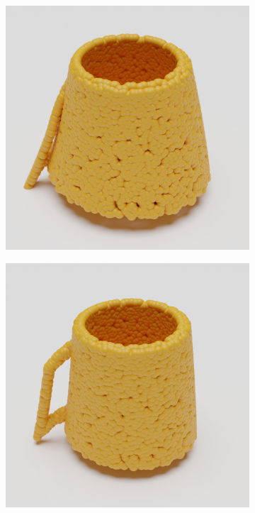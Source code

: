\documentclass{article}
\begin{document}
\begin{figure}
\begin{subfigure}[b]{0.19\textwidth}
    \end{subfigure}
    \begin{subfigure}[b]{0.19\textwidth}
        \includegraphics[width=\textwidth]{figures/blender/warp3/21.png}
    \end{subfigure}
    \begin{subfigure}[b]{0.19\textwidth}
        \includegraphics[width=\textwidth]{figures/blender/warp3/22.png}

\end{subfigure}
\end{figure}
\end{document}
